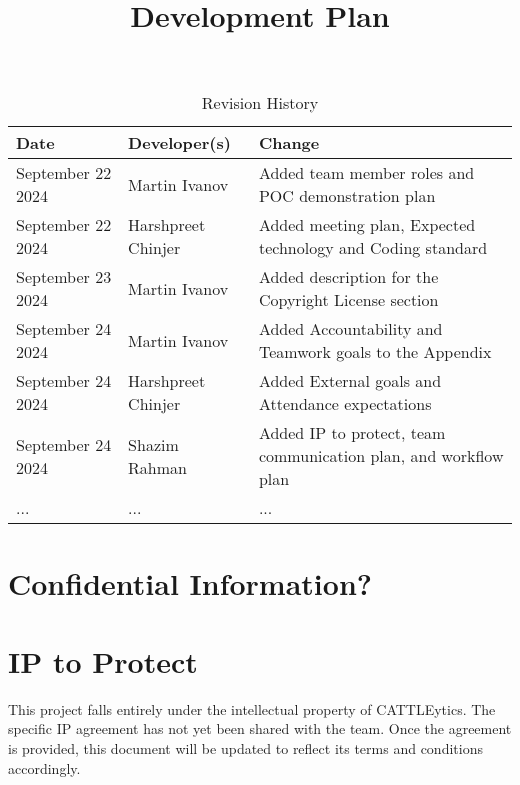 \documentclass{article}
\title{Development Plan\\\progname}
\author{\authname}
\date{}
\begin{document}
\maketitle

\begin{table}[hp]
\caption{Revision History} \label{TblRevisionHistory}
\begin{tabularx}{\textwidth}{llX}
\toprule
\textbf{Date} & \textbf{Developer(s)} & \textbf{Change}\\
\midrule
September 22 2024 & Martin Ivanov & Added team member roles and POC demonstration plan\\
September 22 2024 & Harshpreet Chinjer & Added meeting plan, Expected technology and Coding standard\\
September 23 2024 & Martin Ivanov & Added description for the Copyright License section\\
September 24 2024 & Martin Ivanov & Added Accountability and Teamwork goals to the Appendix\\
September 24 2024 & Harshpreet Chinjer & Added External goals and Attendance expectations\\
September 24 2024 & Shazim Rahman & Added IP to protect, team communication plan, and workflow plan\\
... & ... & ...\\
\bottomrule
\end{tabularx}
\end{table}

\newpage{}



\section{Confidential Information?}



\section{IP to Protect}
This project falls entirely under the intellectual property of CATTLEytics. The specific IP agreement has not yet been shared with the team. Once the agreement is provided, this document will be updated to reflect its terms and conditions accordingly.
\end{document}
